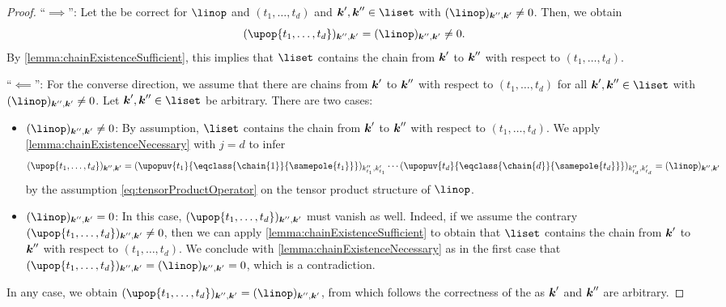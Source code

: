\begin{proof}
  ``$\implies$'':
  Let the \up be correct for $\linop$ and $(t_1, \dotsc, t_d)$
  and $\*k', \*k'' \in \liset$ with $(\linop)_{\*k'',\*k'} \not= 0$.
  Then, we obtain
  \begin{equation}
    (\upop{t_1,\dotsc,t_d})_{\*k'',\*k'}
    = (\linop)_{\*k'',\*k'}
    \not= 0.
  \end{equation}
  By \cref{lemma:chainExistenceSufficient},
  this implies that $\liset$ contains the chain from ${\boldsymbol{k}}'$ to ${\boldsymbol{k}}''$
  with respect to $(t_1, \dotsc, t_d)$.
  
  ``$\impliedby$'':
  For the converse direction, we assume that there are chains
  from ${\boldsymbol{k}}'$ to ${\boldsymbol{k}}''$ with respect to $(t_1, \dotsc, t_d)$
  for all $\*k', \*k'' \in \liset$ with $(\linop)_{\*k'',\*k'} \not= 0$.
  Let $\*k', \*k'' \in \liset$ be arbitrary.
  There are two cases:
  \begin{itemize}
    \item
    ${(\linop)_{\*k'',\*k'} \not= 0}$:
    By assumption, $\liset$ contains the chain from ${\boldsymbol{k}}'$ to ${\boldsymbol{k}}''$
    with respect to $(t_1, \dotsc, t_d)$.
    We apply \cref{lemma:chainExistenceNecessary} with $j = d$
    to infer
    \begin{equation}
      (\upop{t_1,\dotsc,t_d})_{\*k'',\*k'}
      =
      (\upopuv{t_1}{\eqclass{\chain{1}}{\samepole{t_1}}})_{k''_{t_1},k'_{t_1}}
      \dotsm
      (\upopuv{t_d}{\eqclass{\chain{d}}{\samepole{t_d}}})_{k''_{t_d},k'_{t_d}}
      = (\linop)_{\*k'',\*k'}
    \end{equation}
    by the assumption \eqref{eq:tensorProductOperator} on
    the tensor product structure of $\linop$.
    
    \item
    ${(\linop)_{\*k'',\*k'} = 0}$:
    In this case, $(\upop{t_1,\dotsc,t_d})_{\*k'',\*k'}$ must vanish as well.
    Indeed, if we assume the contrary
    $(\upop{t_1,\dotsc,t_d})_{\*k'',\*k'} \not= 0$,
    then we can apply \cref{lemma:chainExistenceSufficient}
    to obtain that $\liset$ contains the chain from ${\boldsymbol{k}}'$ to ${\boldsymbol{k}}''$
    with respect to $(t_1, \dotsc, t_d)$.
    We conclude with \cref{lemma:chainExistenceNecessary} as in the first case
    that $(\upop{t_1,\dotsc,t_d})_{\*k'',\*k'} = (\linop)_{\*k'',\*k'} = 0$,
    which is a contradiction.
  \end{itemize}
  In any case, we obtain
  $(\upop{t_1,\dotsc,t_d})_{\*k'',\*k'} = (\linop)_{\*k'',\*k'}$,
  from which follows the correctness of the \up\punctfix{,}
  as ${\boldsymbol{k}}'$ and ${\boldsymbol{k}}''$ are arbitrary.
\end{proof}



